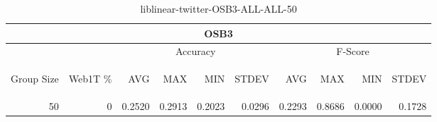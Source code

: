 \begin{center}
\begin{table}[htbp] 
 \begin{center}
\begin{tabular}{ | r | r | r | r | r | r | r | r | r | r |}
\hline
\multicolumn{10}{|c|}{OSB3}\\
\hline
 & & \multicolumn{4}{|c|}{Accuracy} & \multicolumn{4}{|c|}{F-Score}\\ \cline{3-10}
\begin{sideways}Group Size\end{sideways} & \begin{sideways}Web1T \%\end{sideways} & \begin{sideways}AVG\end{sideways} & \begin{sideways}MAX\end{sideways} & \begin{sideways}MIN\end{sideways} & \begin{sideways}STDEV\end{sideways} & \begin{sideways}AVG\end{sideways} & \begin{sideways}MAX\end{sideways} & \begin{sideways}MIN\end{sideways} & \begin{sideways}STDEV\end{sideways}\\
\hline
\multirow{0}{*}{50}
 & 0 & 0.2520 & 0.2913 & 0.2023 & 0.0296 & 0.2293 & 0.8686 & 0.0000 & 0.1728\\ \cline{2-10}
\hline
\end{tabular}
\caption{liblinear-twitter-OSB3-ALL-ALL-50}
\label{table:liblinear-twitter-OSB3-ALL-ALL-50}
\end{center}
 \end{table}
\end{center}

